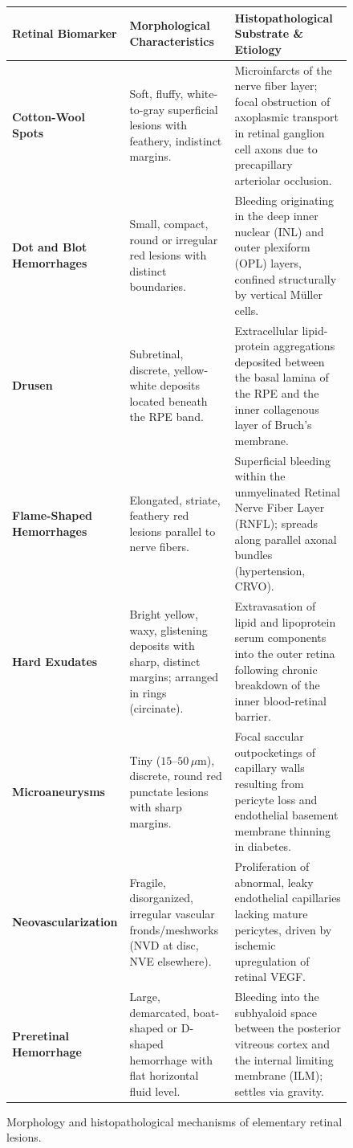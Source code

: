 \documentclass[11pt,a4paper]{article}
\begin{document}
\begin{figure}[htbp]
\centering
\setlength{\tabcolsep}{4pt}
\begin{tabular}{p{3.5cm}p{5.5cm}p{5.5cm}}
\toprule
\textbf{Retinal Biomarker} & \textbf{Morphological Characteristics} & \textbf{Histopathological Substrate \& Etiology} \\
\midrule
\textbf{Cotton-Wool Spots} & Soft, fluffy, white-to-gray superficial lesions with feathery, indistinct margins. & Microinfarcts of the nerve fiber layer; focal obstruction of axoplasmic transport in retinal ganglion cell axons due to precapillary arteriolar occlusion. \\
\addlinespace
\textbf{Dot and Blot Hemorrhages} & Small, compact, round or irregular red lesions with distinct boundaries. & Bleeding originating in the deep inner nuclear (INL) and outer plexiform (OPL) layers, confined structurally by vertical Müller cells. \\
\addlinespace
\textbf{Drusen} & Subretinal, discrete, yellow-white deposits located beneath the RPE band. & Extracellular lipid-protein aggregations deposited between the basal lamina of the RPE and the inner collagenous layer of Bruch's membrane. \\
\addlinespace
\textbf{Flame-Shaped Hemorrhages} & Elongated, striate, feathery red lesions parallel to nerve fibers. & Superficial bleeding within the unmyelinated Retinal Nerve Fiber Layer (RNFL); spreads along parallel axonal bundles (hypertension, CRVO). \\
\addlinespace
\textbf{Hard Exudates} & Bright yellow, waxy, glistening deposits with sharp, distinct margins; arranged in rings (circinate). & Extravasation of lipid and lipoprotein serum components into the outer retina following chronic breakdown of the inner blood-retinal barrier. \\
\addlinespace
\textbf{Microaneurysms} & Tiny ($15\text{--}50\,\mu\text{m}$), discrete, round red punctate lesions with sharp margins. & Focal saccular outpocketings of capillary walls resulting from pericyte loss and endothelial basement membrane thinning in diabetes. \\
\addlinespace
\textbf{Neovascularization} & Fragile, disorganized, irregular vascular fronds/meshworks (NVD at disc, NVE elsewhere). & Proliferation of abnormal, leaky endothelial capillaries lacking mature pericytes, driven by ischemic upregulation of retinal VEGF. \\
\addlinespace
\textbf{Preretinal Hemorrhage} & Large, demarcated, boat-shaped or D-shaped hemorrhage with flat horizontal fluid level. & Bleeding into the subhyaloid space between the posterior vitreous cortex and the internal limiting membrane (ILM); settles via gravity. \\
\bottomrule
\end{tabular}
\caption{Morphology and histopathological mechanisms of elementary retinal lesions.}
\label{tab:retinal_lesions}
\end{figure}
\end{document}

